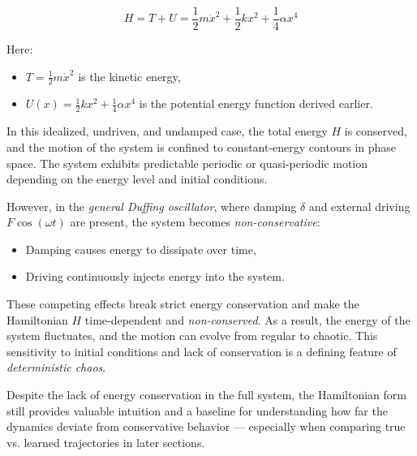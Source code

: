 \documentclass{article}
\begin{document}
\begin{equation}
    H = T + U = \frac{1}{2}m\dot{x}^2 + \frac{1}{2}kx^2 + \frac{1}{4}\alpha x^4
\end{equation}

Here:
\begin{itemize}
    \item $T = \frac{1}{2}m\dot{x}^2$ is the kinetic energy,
    \item $U(x) = \frac{1}{2}kx^2 + \frac{1}{4}\alpha x^4$ is the potential energy function derived earlier.
\end{itemize}

In this idealized, undriven, and undamped case, the total energy $H$ is conserved, and the motion of the system is confined to constant-energy contours in phase space. The system exhibits predictable periodic or quasi-periodic motion depending on the energy level and initial conditions.

However, in the \textit{general Duffing oscillator}, where damping $\delta$ and external driving $F \cos(\omega t)$ are present, the system becomes \textit{non-conservative}:
\begin{itemize}
    \item Damping causes energy to dissipate over time,
    \item Driving continuously injects energy into the system.
\end{itemize}

These competing effects break strict energy conservation and make the Hamiltonian $H$ time-dependent and \textit{non-conserved}. As a result, the energy of the system fluctuates, and the motion can evolve from regular to chaotic. This sensitivity to initial conditions and lack of conservation is a defining feature of \textit{deterministic chaos}.

Despite the lack of energy conservation in the full system, the Hamiltonian form still provides valuable intuition and a baseline for understanding how far the dynamics deviate from conservative behavior — especially when comparing true vs. learned trajectories in later sections.

\end{document}
